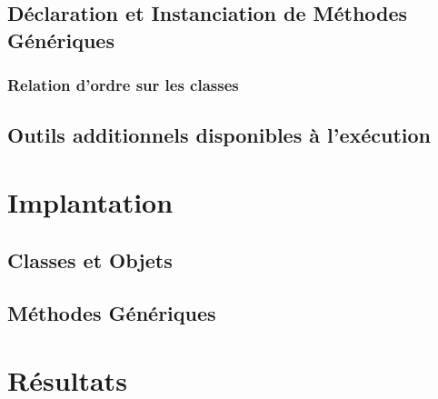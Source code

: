 \documentclass[letterpaper,12pt]{book}
\begin{document}
    \subsection{Déclaration et Instanciation de Méthodes Génériques}

      \subsubsection{Relation d'ordre sur les classes}
        \label{rel-ordre}

    \subsection{Outils additionnels disponibles à l'exécution}

\clearpage



\section{Implantation}

\subsection{Classes et Objets}

\subsection{Méthodes Génériques}


\clearpage

\section{Résultats}



\clearpage
\end{document}
